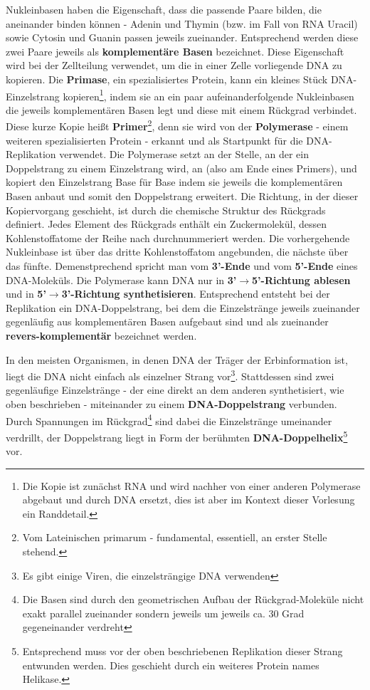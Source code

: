   Nukleinbasen haben die Eigenschaft, dass die passende Paare bilden, die aneinander binden können - Adenin und Thymin (bzw. im Fall von RNA Uracil) sowie Cytosin und Guanin passen jeweils zueinander. Entsprechend werden diese zwei Paare jeweils als \textbf{komplementäre Basen} bezeichnet. Diese Eigenschaft wird bei der Zellteilung verwendet, um die in einer Zelle vorliegende DNA zu kopieren. Die \textbf{Primase}, ein spezialisiertes Protein, kann ein kleines Stück DNA-Einzelstrang kopieren\footnote{Die Kopie ist zunächst RNA und wird nachher von einer anderen Polymerase abgebaut und durch DNA ersetzt, dies ist aber im Kontext dieser Vorlesung ein Randdetail.}, indem sie an ein paar aufeinanderfolgende Nukleinbasen die jeweils komplementären Basen legt und diese mit einem Rückgrad verbindet. Diese kurze Kopie heißt \textbf{Primer}\footnote{Vom Lateinischen primarum - fundamental, essentiell, an erster Stelle stehend.}, denn sie wird von der \textbf{Polymerase} - einem weiteren spezialisierten Protein - erkannt und als Startpunkt für die DNA-Replikation verwendet. Die Polymerase setzt an der Stelle, an der ein Doppelstrang zu einem Einzelstrang wird, an (also am Ende eines Primers), und kopiert den Einzelstrang Base für Base indem sie jeweils die komplementären Basen anbaut und somit den Doppelstrang erweitert. Die Richtung, in der dieser Kopiervorgang geschieht, ist durch die chemische Struktur des Rückgrads definiert. Jedes Element des Rückgrads enthält ein Zuckermolekül, dessen Kohlenstoffatome der Reihe nach durchnummeriert werden. Die vorhergehende Nukleinbase ist über das dritte Kohlenstoffatom angebunden, die nächste über das fünfte. Demenstprechend spricht man vom \textbf{3'-Ende} und vom \textbf{5'-Ende} eines DNA-Moleküls. Die Polymerase kann DNA nur in \textbf{3'$\rightarrow$5'-Richtung ablesen} und in \textbf{5'$\rightarrow$3'-Richtung synthetisieren}. Entsprechend entsteht bei der Replikation ein DNA-Doppelstrang, bei dem die Einzelstränge jeweils zueinander gegenläufig aus komplementären Basen aufgebaut sind und als zueinander \textbf{revers-komplementär} bezeichnet werden.

  In den meisten Organismen, in denen DNA der Träger der Erbinformation ist, liegt die DNA nicht einfach als einzelner Strang vor\footnote{Es gibt einige Viren, die einzelsträngige DNA verwenden}. Stattdessen sind zwei gegenläufige Einzelstränge - der eine direkt an dem anderen synthetisiert, wie oben beschrieben - miteinander zu einem \textbf{DNA-Doppelstrang} verbunden. Durch Spannungen im Rückgrad\footnote{Die Basen sind durch den geometrischen Aufbau der Rückgrad-Moleküle nicht exakt parallel zueinander sondern jeweils um jeweils ca. 30 Grad gegeneinander verdreht} sind dabei die Einzelstränge umeinander verdrillt, der Doppelstrang liegt in Form der berühmten \textbf{DNA-Doppelhelix}\footnote{Entsprechend muss vor der oben beschriebenen Replikation dieser Strang entwunden werden. Dies geschieht durch ein weiteres Protein names Helikase.} vor. 

